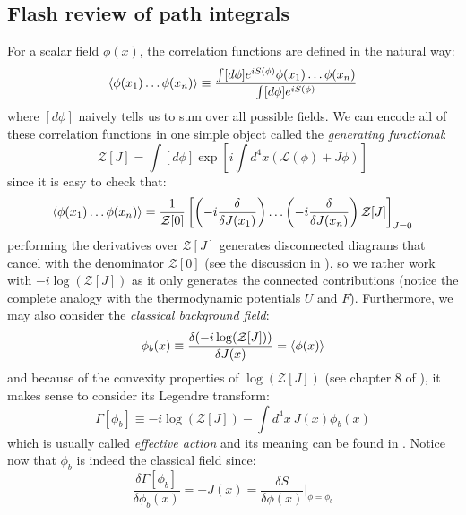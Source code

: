 \documentclass[11pt]{article}
\begin{document}
\subsection{Flash review of path integrals}
For a scalar field $\phi(x)$, the correlation functions are defined in the natural way:
\begin{equation}
    \braket{\phi(x_1)\ldots\phi(x_n)}\equiv\dfrac{\int [d\phi]e^{iS(\phi)}\phi(x_1)\ldots\phi(x_n)}{\int [d\phi]e^{iS(\phi)}}
\end{equation}
where $[d\phi]$ naively tells us to sum over all possible fields. We can encode all of these correlation functions in one simple object called the \textit{generating functional}:
\begin{equation}
    \mathcal{Z}[J]=\int [d\phi]\exp\left[i\int d^4x(\mathcal{L}(\phi)+J\phi)\right]
\end{equation}
since it is easy to check that:
\begin{equation}
     \braket{\phi(x_1)\ldots\phi(x_n)}=\dfrac{1}{\mathcal{Z}[0]}\left[\left(-i\dfrac{\delta}{\delta J(x_1)} \right)\ldots\left(-i\dfrac{\delta}{\delta J(x_n)} \right)\mathcal{Z}[J]\right]_{J=0}
\end{equation}
performing the derivatives over $\mathcal{Z}[J]$ generates disconnected diagrams that cancel with the denominator $\mathcal{Z}[0]$ (see the discussion in \cite{RodriguezCalleja:2025ljh}), so we rather work with $-i\log(\mathcal{Z}[J])$ as it only generates the connected contributions (notice the complete analogy with the thermodynamic potentials $U$ and $F$). Furthermore, we may also consider the \textit{classical background field}:
\begin{equation}
    \phi_b(x)\equiv \dfrac{\delta( -i\log(\mathcal{Z}[J]))}{\delta J(x)}=\braket{\phi(x)}
\end{equation}
and because of the convexity properties of $\log(\mathcal{Z}[J])$ (see chapter 8 of \cite{Zinn-Justin}), it makes sense to consider its Legendre transform:
\begin{equation}
    \Gamma[\phi_b]\equiv -i\log(\mathcal{Z}[J])-\int d^4x\ J(x)\phi_b(x)
\end{equation}
which is usually called \textit{effective action} and its meaning can be found in \cite{Coleman_1985}. Notice now that $\phi_b$ is indeed the classical field since:
\begin{equation}
    \dfrac{\delta  \Gamma[\phi_b]}{\delta \phi_b(x)}=-J(x)=\dfrac{\delta S}{\delta\phi(x)}\Bigg|_{\phi=\phi_b}
\end{equation}
\end{document}
